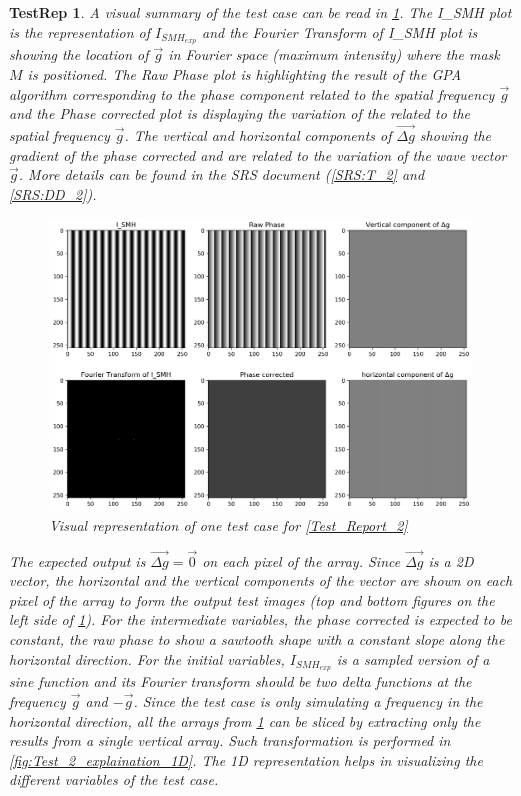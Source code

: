 \documentclass[12pt, titlepage]{article}
\newtheorem{TestRep}{TestRep}
\begin{document}
\begin{TestRep}
A visual summary of the test case can be read in \cref{fig:Test_2_explanation}. The I{\_}SMH plot is the representation of $I_{SMH_{exp}}$ and the Fourier Transform of I{\_}SMH plot is showing the location of $\overrightarrow{g}$ in Fourier space (maximum intensity) where the mask $M$ is positioned. The Raw Phase plot is highlighting the result of the GPA algorithm corresponding to the phase component related to the spatial frequency $\overrightarrow{g}$ and the Phase corrected plot is displaying the variation of the related to the spatial frequency $\overrightarrow{g}$. The vertical and horizontal components of $\overrightarrow{\Delta g}$ showing the gradient of the phase corrected and are related to the variation of the wave vector $\overrightarrow{g}$. More details can be found in the SRS document (\cref{SRS:T_2} and \cref{SRS:DD_2}).

\begin{figure}[H]
\begin{center}
\includegraphics[scale=0.5]{Figures/Test_2_explanation.png}
\caption{Visual representation of one test case for \cref{Test_Report_2}}
\label{fig:Test_2_explanation}
\end{center}
\end{figure}

The expected output is $\overrightarrow{\Delta g} = \overrightarrow{0}$ on each pixel of the array. Since $\overrightarrow{\Delta g}$ is a 2D vector, the horizontal and the vertical components of the vector are shown on each pixel of the array to form the output test images (top and bottom figures on the left side of \cref{fig:Test_2_explanation}). For the intermediate variables, the phase corrected is expected to be constant, the raw phase to show a sawtooth shape with a constant slope along the horizontal direction. For the initial variables, $I_{SMH_{exp}}$ is a sampled version of a sine function and its Fourier transform should be two delta functions at the frequency $\overrightarrow{g}$ and $-\overrightarrow{g}$. Since the test case is only simulating a frequency in the horizontal direction, all the arrays from \cref{fig:Test_2_explanation} can be sliced by extracting only the results from a single vertical array. Such transformation is performed in \cref{fig:Test_2_explaination_1D}. The 1D representation helps in visualizing the different variables of the test case. 


\end{TestRep}
\end{document}

